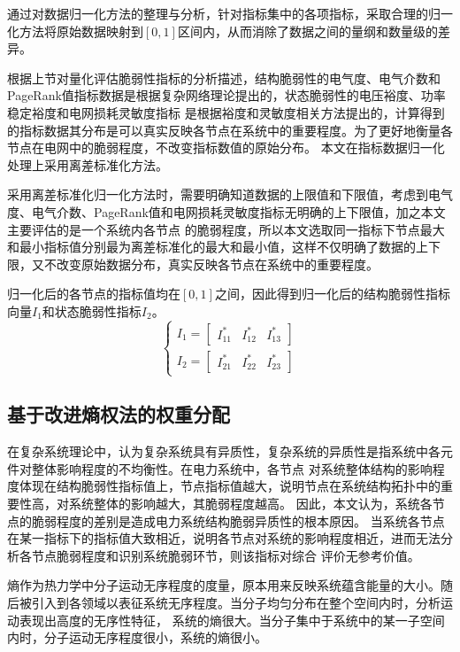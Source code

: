 通过对数据归一化方法的整理与分析，针对指标集中的各项指标，采取合理的归一化方法将原始数据映射到$\left[0,1\right]$区间内，从而消除了数据之间的量纲和数量级的差异。

根据上节对量化评估脆弱性指标的分析描述，结构脆弱性的电气度、电气介数和PageRank值指标数据是根据复杂网络理论提出的，状态脆弱性的电压裕度、功率稳定裕度和电网损耗灵敏度指标
是根据裕度和灵敏度相关方法提出的，计算得到的指标数据其分布是可以真实反映各节点在系统中的重要程度。为了更好地衡量各节点在电网中的脆弱程度，不改变指标数值的原始分布。
本文在指标数据归一化处理上采用离差标准化方法。

采用离差标准化归一化方法时，需要明确知道数据的上限值和下限值，考虑到电气度、电气介数、PageRank值和电网损耗灵敏度指标无明确的上下限值，加之本文主要评估的是一个系统内各节点
的脆弱程度，所以本文选取同一指标下节点最大和最小指标值分别最为离差标准化的最大和最小值，这样不仅明确了数据的上下限，又不改变原始数据分布，真实反映各节点在系统中的重要程度。

归一化后的各节点的指标值均在$\left[0,1\right]$之间，因此得到归一化后的结构脆弱性指标向量$I_1$和状态脆弱性指标$I_2$。
\begin{equation}
  \left\{\begin{array}{l}{I_{1}=\left[\begin{array}{lll}{I_{11}^{*}} & {I_{12}^{*}} & {I_{13}^{*}}\end{array}\right]} \\
   {I_{2}=\left[\begin{array}{lll}{I_{21}^{*}} & {I_{22}^{*}} & {I_{23}^{*}}\end{array}\right]}\end{array}\right.
  \end{equation}

  
\subsection{基于改进熵权法的权重分配}
\label{sec:nomalz}
在复杂系统理论中，认为复杂系统具有异质性，复杂系统的异质性是指系统中各元件对整体影响程度的不均衡性。在电力系统中，各节点
对系统整体结构的影响程度体现在结构脆弱性指标值上，节点指标值越大，说明节点在系统结构拓扑中的重要性高，对系统整体的影响越大，其脆弱程度越高。
因此，本文认为，系统各节点的脆弱程度的差别是造成电力系统结构脆弱异质性的根本原因。
当系统各节点在某一指标下的指标值大致相近，说明各节点对系统的影响程度相近，进而无法分析各节点脆弱程度和识别系统脆弱环节，则该指标对综合
评价无参考价值。

熵作为热力学中分子运动无序程度的度量，原本用来反映系统蕴含能量的大小。随后被引入到各领域以表征系统无序程度。当分子均匀分布在整个空间内时，分析运动表现出高度的无序性特征，
系统的熵很大。当分子集中于系统中的某一子空间内时，分子运动无序程度很小，系统的熵很小\cite{refs76}。

